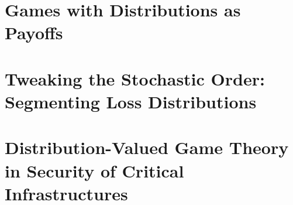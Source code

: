 \documentclass[a4paper]{scrreprt}
\begin{document}
    
    
    
   
    \chapter{Games with Distributions as Payoffs}
    
    
    \chapter{Tweaking the Stochastic Order: Segmenting Loss Distributions}
    
    
    \chapter{Distribution-Valued Game Theory in Security of Critical Infrastructures}
    
\end{document}
